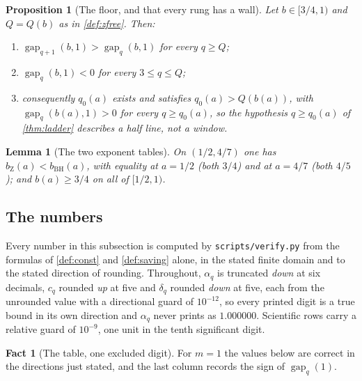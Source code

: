 \documentclass[11pt]{amsart}
\newtheorem{proposition}[theorem]{Proposition}
\newtheorem{lemma}[theorem]{Lemma}
\theoremstyle{definition}
\newtheorem{fact}[theorem]{Fact}
\theoremstyle{remark}
\begin{document}
\begin{proposition}[The floor, and that every rung has a wall]
\label{prop:floor}
Let $b \in [3/4, 1)$ and $Q = Q(b)$ as in \cref{def:zfree}. Then:
\begin{enumerate}
  \item $\operatorname{gap}_{q+1}(b,1) > \operatorname{gap}_q(b,1)$ for every $q \ge Q$;
  \item $\operatorname{gap}_q(b,1) < 0$ for every $3 \le q \le Q$;
  \item consequently $q_0(a)$ exists and satisfies $q_0(a) > Q(b(a))$, with $\operatorname{gap}_q(b(a),1) > 0$ for every $q \ge q_0(a)$, so the hypothesis $q \ge q_0(a)$ of \cref{thm:ladder} describes a half line, not a window.
\end{enumerate}
\end{proposition}

\begin{lemma}[The two exponent tables]
\label{lem:btable}
On $(1/2, 4/7)$ one has $b_{\mathrm Z}(a) < b_{\mathrm{BH}}(a)$, with equality at $a = 1/2$ (both $3/4$) and at $a = 4/7$ (both $4/5$); and $b(a) \ge 3/4$ on all of $[1/2, 1)$.
\end{lemma}

\subsection*{The numbers}

Every number in this subsection is computed by \texttt{scripts/verify.py} from the formulas of \cref{def:const} and \cref{def:saving} alone, in the stated finite domain and to the stated direction of rounding. Throughout, $\alpha_q$ is truncated \emph{down} at six decimals, $c_q$ rounded \emph{up} at five and $\delta_q$ rounded \emph{down} at five, each from the unrounded value with a directional guard of $10^{-12}$, so every printed digit is a true bound in its own direction and $\alpha_q$ never prints as $1.000000$. Scientific rows carry a relative guard of $10^{-9}$, one unit in the tenth significant digit.

\begin{fact}[The table, one excluded digit]
\label{fact:table}
For $m = 1$ the values below are correct in the directions just stated, and the last column records the sign of $\operatorname{gap}_q(1)$.
\end{fact}
\end{document}
